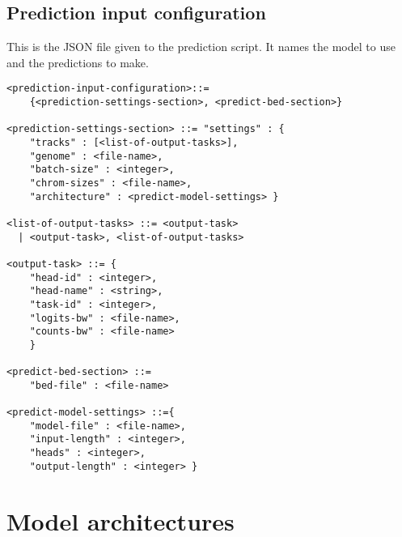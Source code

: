 \documentclass{article}
\begin{document}
\subsection{Prediction input configuration}
This is the JSON file given to the prediction script. It names the model to use and the predictions to make. 

\begin{lstlisting}
<prediction-input-configuration>::=
    {<prediction-settings-section>, <predict-bed-section>}

<prediction-settings-section> ::= "settings" : {
    "tracks" : [<list-of-output-tasks>],
    "genome" : <file-name>,
    "batch-size" : <integer>,
    "chrom-sizes" : <file-name>,
    "architecture" : <predict-model-settings> }

<list-of-output-tasks> ::= <output-task> 
  | <output-task>, <list-of-output-tasks>

<output-task> ::= {
    "head-id" : <integer>,
    "head-name" : <string>,
    "task-id" : <integer>,
    "logits-bw" : <file-name>, 
    "counts-bw" : <file-name>
    }

<predict-bed-section> ::=
    "bed-file" : <file-name>

<predict-model-settings> ::={
    "model-file" : <file-name>,
    "input-length" : <integer>,
    "heads" : <integer>,
    "output-length" : <integer> }
\end{lstlisting}


\section{Model architectures}
\end{document}
